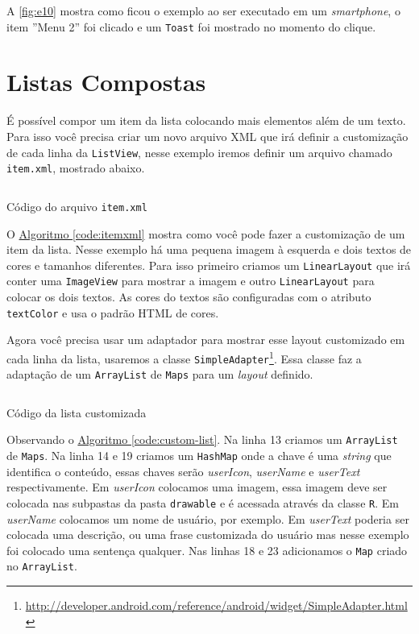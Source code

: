 \documentclass[a4paper,12pt,brazil,oneside]{book}
\begin{document}
\begin{singlespace}
A \autoref{fig:e10} mostra como ficou o exemplo ao ser executado em um \emph{smartphone}, o item ''Menu 2'' foi clicado e um \texttt{Toast} foi mostrado no momento do clique.

\section{Listas Compostas}
É possível compor um item da lista colocando mais elementos além de um texto. Para isso você precisa criar um novo arquivo XML que irá definir a customização de cada linha da \texttt{ListView}, nesse exemplo iremos definir um arquivo chamado \texttt{item.xml}, mostrado abaixo.


\begin{listing}[H]
\inputminted[linenos=true,fontsize=\small,frame=lines, framesep=2mm, tabsize=2,numbersep=5pt]{xml}{src/design/item.xml}
\caption{Código do arquivo \texttt{item.xml}}
\label{code:itemxml}
\end{listing}	

O \hyperref[code:itemxml]{Algoritmo \ref*{code:itemxml}} mostra como você pode fazer a customização de um item da lista. Nesse exemplo há uma pequena imagem à esquerda e dois textos de cores e tamanhos diferentes. 
Para isso primeiro criamos um \texttt{LinearLayout} que irá conter uma \texttt{ImageView} para mostrar a imagem e outro \texttt{LinearLayout} para colocar os dois textos. As cores do textos são configuradas com o atributo \texttt{textColor} e usa o padrão HTML de cores.

Agora você precisa usar um adaptador para mostrar esse layout customizado em cada linha da lista, usaremos a classe \texttt{SimpleAdapter}\footnote{\href{http://developer.android.com/reference/android/widget/SimpleAdapter.html}{http://developer.android.com/reference/android/widget/SimpleAdapter.html}}. Essa classe faz a adaptação de um \texttt{ArrayList} de \texttt{Maps} para um \emph{layout} definido. 

\begin{listing}[H]
\inputminted[linenos=true,fontsize=\small,frame=lines, framesep=2mm, tabsize=2,numbersep=5pt]{java}{src/design/customlist.java}
\caption{Código da lista customizada}
\label{code:custom-list}
\end{listing}	

Observando o \hyperref[code:custom-list]{Algoritmo \ref*{code:custom-list}}. Na linha 13 criamos um \texttt{ArrayList} de \texttt{Maps}. Na linha 14 e 19 criamos um \texttt{HashMap} onde a chave é uma \emph{string} que identifica o conteúdo, essas chaves serão \emph{userIcon}, \emph{userName} e \emph{userText} respectivamente. Em \emph{userIcon} colocamos uma imagem, essa imagem deve ser colocada nas subpastas da pasta \texttt{drawable} e é acessada através da classe \texttt{R}. Em \emph{userName} colocamos um nome de usuário, por exemplo. Em \emph{userText} poderia ser colocada uma descrição, ou uma frase customizada do usuário mas nesse exemplo foi colocado uma sentença qualquer. Nas linhas 18 e 23 adicionamos o \texttt{Map} criado no \texttt{ArrayList}.


\end{singlespace}
\end{document}
